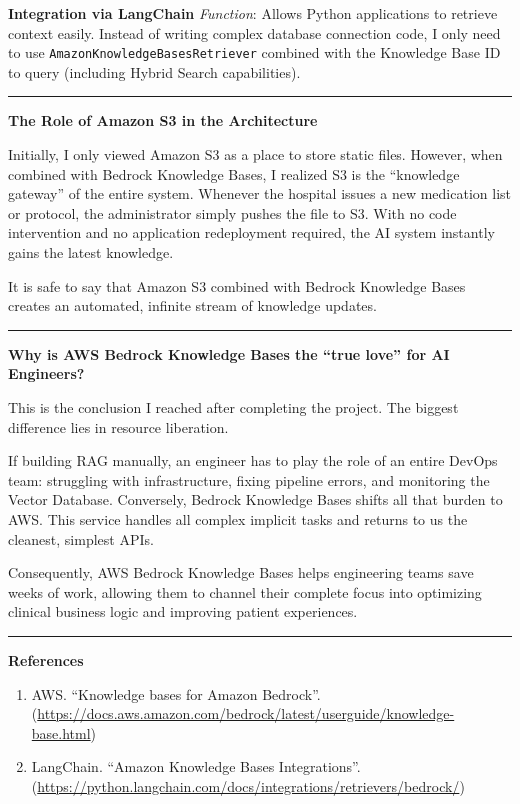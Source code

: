 \textbf{Integration via LangChain} \emph{Function}: Allows Python
applications to retrieve context easily. Instead of writing complex
database connection code, I only need to use
\texttt{AmazonKnowledgeBasesRetriever} combined with the Knowledge Base
ID to query (including Hybrid Search capabilities).

\begin{center}\rule{0.5\linewidth}{0.5pt}\end{center}

\vspace{0.5em}\noindent\textbf{The Role of Amazon S3 in the Architecture}

Initially, I only viewed Amazon S3 as a place to store static files.
However, when combined with Bedrock Knowledge Bases, I realized S3 is
the ``knowledge gateway'' of the entire system. Whenever the hospital
issues a new medication list or protocol, the administrator simply
pushes the file to S3. With no code intervention and no application
redeployment required, the AI system instantly gains the latest
knowledge.

It is safe to say that Amazon S3 combined with Bedrock Knowledge Bases
creates an automated, infinite stream of knowledge updates.

\begin{center}\rule{0.5\linewidth}{0.5pt}\end{center}

\vspace{0.5em}\noindent\textbf{Why is AWS Bedrock Knowledge Bases the ``true love'' for
AI Engineers?}

This is the conclusion I reached after completing the project. The
biggest difference lies in resource liberation.

If building RAG manually, an engineer has to play the role of an entire
DevOps team: struggling with infrastructure, fixing pipeline errors, and
monitoring the Vector Database. Conversely, Bedrock Knowledge Bases
shifts all that burden to AWS. This service handles all complex implicit
tasks and returns to us the cleanest, simplest APIs.

Consequently, AWS Bedrock Knowledge Bases helps engineering teams save
weeks of work, allowing them to channel their complete focus into
optimizing clinical business logic and improving patient experiences.

\begin{center}\rule{0.5\linewidth}{0.5pt}\end{center}

\vspace{0.5em}\noindent\textbf{References}

\begin{enumerate}
\def\labelenumi{\arabic{enumi}.}
\tightlist
\item
  AWS. ``Knowledge bases for Amazon Bedrock''.
  (\url{https://docs.aws.amazon.com/bedrock/latest/userguide/knowledge-base.html})
\item
  LangChain. ``Amazon Knowledge Bases Integrations''.
  (\url{https://python.langchain.com/docs/integrations/retrievers/bedrock/})
\end{enumerate}
